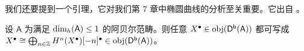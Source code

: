 
我们还要提到一个引理，它对我们第 7 章中椭圆曲线的分析至关重要。它出自 \cite[Exercise 13.13]{[KS06]}。

\begin{Lem}\label{whendimhleq1}
	设 $\mathsf{A}$ 为满足 $\textup{dim}_h(\mathsf{A})\leq 1$ 的阿贝尔范畴。则任意 $X^\bullet\in\textup{obj}(\mathsf{D^b(A)})$ 都可写成 $X^\bullet\cong\bigoplus_{n\in\mathbb{Z}} H^n(X^\bullet)[-n]^\bullet\in\textup{obj}(\mathsf{D^b(A)})$。
\end{Lem}


\newpage



